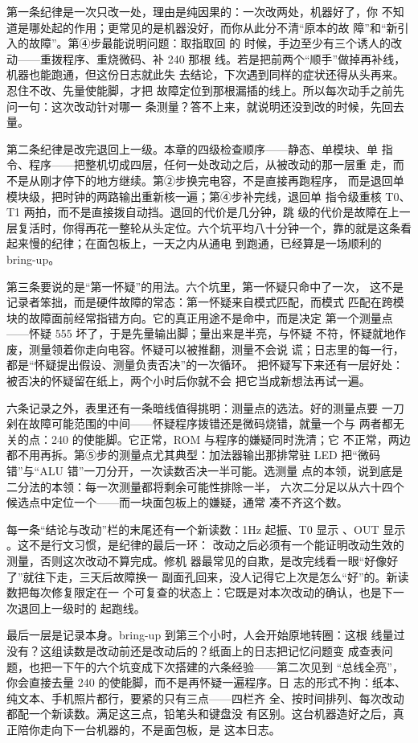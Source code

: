 第一条纪律是一次只改一处，理由是纯因果的：一次改两处，机器好了，你
不知道是哪处起的作用；更常见的是机器没好，而你从此分不清“原本的故
障”和“新引入的故障”。第④步最能说明问题：取指取回  的
时候，手边至少有三个诱人的改动——重拨程序、重烧微码、补 240 那根
线。若是把前两个“顺手”做掉再补线，机器也能跑通，但这份日志就此失
去结论，下次遇到同样的症状还得从头再来。忍住不改、先量使能脚，才把
故障定位到那根漏插的线上。所以每次动手之前先问一句：这次改动针对哪一
条测量？答不上来，就说明还没到改的时候，先回去量。

第二条纪律是改完退回上一级。本章的四级检查顺序——静态、单模块、单
指令、程序——把整机切成四层，任何一处改动之后，从被改动的那一层重
走，而不是从刚才停下的地方继续。第②步换完电容，不是直接再跑程序，
而是退回单模块级，把时钟的两路输出重新核一遍；第④步补完线，退回单
指令级重核 T0、T1 两拍，而不是直接拨自动挡。退回的代价是几分钟，跳
级的代价是故障在上一层复活时，你得再花一整轮从头定位。六个坑平均八十分钟一个，靠的就是这条看起来慢的纪律；在面包板上，一天之内从通电
到跑通，已经算是一场顺利的 bring-up。

第三条要说的是“第一怀疑”的用法。六个坑里，第一怀疑只命中了一次，
这不是记录者笨拙，而是硬件故障的常态：第一怀疑来自模式匹配，而模式
匹配在跨模块的故障面前经常指错方向。它的真正用途不是命中，而是决定
第一个测量点——怀疑 555 坏了，于是先量输出脚；量出来是半亮，与怀疑
不符，怀疑就地作废，测量领着你走向电容。怀疑可以被推翻，测量不会说
谎；日志里的每一行，都是“怀疑提出假设、测量负责否决”的一次循环。
把怀疑写下来还有一层好处：被否决的怀疑留在纸上，两个小时后你就不会
把它当成新想法再试一遍。

六条记录之外，表里还有一条暗线值得挑明：测量点的选法。好的测量点要
一刀剁在故障可能范围的中间——怀疑程序拨错还是微码烧错，就量一个与
两者都无关的点：240 的使能脚。它正常，ROM 与程序的嫌疑同时洗清；它
不正常，两边都不用再拆。第⑤步的测量点尤其典型：加法器输出那排常驻
LED 把“微码错”与“ALU 错”一刀分开，一次读数否决一半可能。选测量
点的本领，说到底是二分法的本领：每一次测量都将剩余可能性排除一半，
六次二分足以从六十四个候选点中定位一个——而一块面包板上的嫌疑，通常
凑不齐这个数。

每一条“结论与改动”栏的末尾还有一个新读数：1Hz 起振、T0 显示
、OUT 显示 。这不是行文习惯，是纪律的最后一环：
改动之后必须有一个能证明改动生效的测量，否则这次改动不算完成。修机
器最常见的自欺，是改完线看一眼“好像好了”就往下走，三天后故障换一
副面孔回来，没人记得它上次是怎么“好”的。新读数把每次修复限定在一
个可复查的状态上：它既是对本次改动的确认，也是下一次退回上一级时的
起跑线。

最后一层是记录本身。bring-up 到第三个小时，人会开始原地转圈：这根
线量过没有？这组读数是改动前还是改动后的？纸面上的日志把记忆问题变
成查表问题，也把一下午的六个坑变成下次搭建的六条经验——第二次见到
“总线全亮”，你会直接去量 240 的使能脚，而不是再怀疑一遍程序。日
志的形式不拘：纸本、纯文本、手机照片都行，要紧的只有三点——四栏齐
全、按时间排列、每次改动都配一个新读数。满足这三点，铅笔头和键盘没
有区别。这台机器造好之后，真正陪你走向下一台机器的，不是面包板，是
这本日志。

